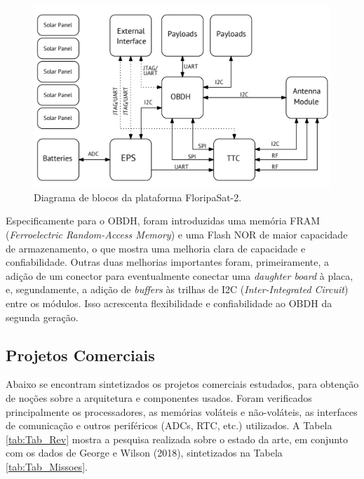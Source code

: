 \begin{figure}[H]
    \centering
    \includegraphics[scale=0.8]{images/floripasat2.png}
    \caption{Diagrama de blocos da plataforma FloripaSat-2.}
    \label{fig:floripasat2}
\end{figure}

Especificamente para o OBDH, foram introduzidas uma memória FRAM (\textit{Ferroelectric Random-Access Memory}) e uma Flash NOR de maior capacidade de armazenamento, o que mostra uma melhoria clara de capacidade e confiabilidade. Outras duas melhorias importantes foram, primeiramente, a adição de um conector para eventualmente conectar uma \textit{daughter board} à placa, e, segundamente, a adição de \textit{buffers} às trilhas de I2C (\textit{Inter-Integrated Circuit}) entre os módulos. Isso acrescenta flexibilidade e confiabilidade ao OBDH da segunda geração.

\subsection{Projetos Comerciais}

Abaixo se encontram sintetizados os projetos comerciais estudados, para obtenção de noções sobre a arquitetura e componentes usados. Foram verificados principalmente os processadores, as memórias voláteis e não-voláteis, as interfaces de comunicação e outros periféricos (ADCs, RTC, etc.) utilizados. A Tabela \ref{tab:Tab_Rev} mostra a pesquisa realizada sobre o estado da arte, em conjunto com os dados de George e Wilson (2018), sintetizados na Tabela \ref{tab:Tab_Missoes}.

